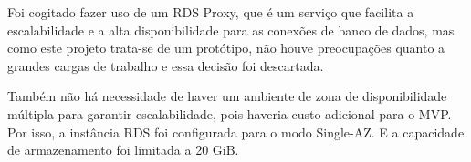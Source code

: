 Foi cogitado fazer uso de um RDS Proxy, que é um serviço que facilita a escalabilidade e a alta disponibilidade para as conexões de banco de dados, mas como este projeto trata-se de um protótipo, não houve preocupações quanto a grandes cargas de trabalho e essa decisão foi descartada. 




Também não há necessidade de haver um ambiente de zona de disponibilidade múltipla para garantir escalabilidade, pois haveria custo adicional para o MVP. Por isso, a instância RDS foi configurada para o modo Single-AZ. E a capacidade de armazenamento foi limitada a 20 GiB.




